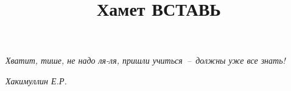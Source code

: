 \documentclass[a4paper,14pt,russian]{article}
\begin{document}
\title{Хамет ВСТАВЬ}
\maketitle
\epigraph{\textit{Хватит, тише, не надо ля-ля, пришли учиться~--~должны уже все знать!}}{\textit{Хакимуллин Е.Р.}}









\end{document}
